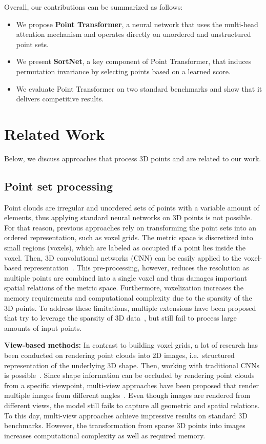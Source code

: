 \documentclass{ieeeaccess}
\begin{document}
Overall, our contributions can be summarized as follows:
\begin{itemize}
    \item We propose \textbf{Point Transformer}, a neural network that uses the multi-head attention mechanism and operates directly on unordered and unstructured point sets.
    \item We present \textbf{SortNet}, a key component of Point Transformer, that induces permutation invariance by selecting points based on a learned score.
    \item We evaluate Point Transformer on two standard benchmarks and show that it delivers competitive results.
\end{itemize}


\section{Related Work}\label{seq:02_rel_work}
Below, we discuss approaches that process 3D points and are related to our work.

\subsection{Point set processing}

Point clouds are irregular and unordered sets of points with a variable amount of elements, thus applying standard neural networks on 3D points is not possible. For that reason, previous approaches rely on transforming the point sets into an ordered representation, such as voxel grids. The metric space is discretized into small regions (voxels), which are labeled as occupied if a point lies inside the voxel. Then, 3D convolutional networks (CNN) can be easily applied to the voxel-based representation~\cite{maturana2015voxnet,wu20153d,zhou2018voxelnet}. This pre-processing, however, reduces the resolution as multiple points are combined into a single voxel and thus damages important spatial relations of the metric space. Furthermore, voxelization increases the memory requirements and computational complexity due to the sparsity of the 3D points. To address these limitations, multiple extensions have been proposed that try to leverage the sparsity of 3D data~\cite{wang2015voting,li2016fpnn,riegler2017octnet}, but still fail to process large amounts of input points.

\textbf{View-based methods:} In contrast to building voxel grids, a lot of research has been conducted on rendering point clouds into 2D images, i.e.~structured representation of the underlying 3D shape. Then, working with traditional CNNs is possible~\cite{shi2015deeppano,su2015multi}. Since shape information can be occluded by rendering point clouds from a specific viewpoint, multi-view approaches have been proposed that render multiple images from different angles~\cite{su2015multi,kanezaki2018rotationnet,su2018deeper,qi2016volumetric}. Even though images are rendered from different views, the model still fails to capture all geometric and spatial relations. To this day, multi-view approaches achieve impressive results on standard 3D benchmarks. However, the transformation from sparse 3D points into images increases computational complexity as well as required memory. 
\end{document}

